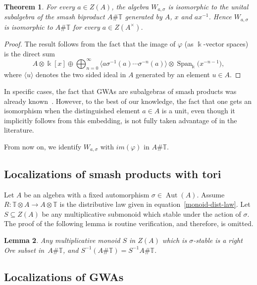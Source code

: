 \documentclass[pdftex]{sigma}
\newcommand{\B}[1]{\mathbb{#1}}
\numberwithin{equation}{section}
\newtheorem{Theorem}{Theorem}[section]
\newtheorem{Lemma}[Theorem]{Lemma}
\begin{document}
\begin{Theorem}\label{thm:UnitCase}
 For every $a\in Z(A)$, the algebra $W_{a,\sigma}$ is isomorphic to the unital subalgebra
 of the smash biproduct $A\# \B{T}$ generated by $A$, $x$ and $ax^{-1}$. Hence
 $W_{a,\sigma}$ is isomorphic to $A\# \B{T}$ for every $a\in Z(A^\times)$.
\end{Theorem}

\begin{proof}
 The result follows from the fact that the image of $\varphi$ (as $\Bbbk$-vector spaces)
 is the direct sum
 \[ A \otimes \Bbbk[x] \oplus \bigoplus_{n=0}^\infty \big\langle
 a\sigma^{-1}(a)\cdots\sigma^{-n}(a)\big\rangle\otimes \operatorname{Span}_{\Bbbk}\bigl(x^{-n-1}\bigr),
 \] where $\langle
 u\rangle$ denotes the two sided ideal in $A$ generated by an element $u\in A$.
\end{proof}

In specific cases, the fact that GWAs are subalgebras of smash products was already
known~\cite[Lemma~2.3]{Boddington:ResolutionOfTypeD}. However, to the best of our knowledge,
the fact that one gets an isomorphism when the distinguished element $a\in A$ is a unit,
even though it implicitly follows from this embedding, is not fully taken advantage of in
the literature.

From now on, we identify $W_{a,\sigma}$ with $im(\varphi)$ in $A\# \B{T}$.

\subsection{Localizations of smash products with tori}
\label{sect:localizationOfSmashProducts}

Let $A$ be an algebra with a fixed automorphism $\sigma\in \operatorname{Aut}(A)$. Assume
$R\colon \B{T}\otimes A\to A\otimes \B{T}$ is the distributive law given in
equation~\eqref{monoid-dist-law}. Let $S\subseteq Z(A)$ be any multiplicative submonoid
which stable under the action of $\sigma$. The proof of the following lemma is routine
verification, and therefore, is omitted.

\begin{Lemma}\label{lem:nc-localization}
 Any multiplicative monoid $S$ in $Z(A)$ which is $\sigma$-stable is a right Ore subset
 in~$A\# \B{T}$, and $S^{-1}(A\# \B{T}) = S^{-1}A\# \B{T}$.
\end{Lemma}

\subsection{Localizations of GWAs}
\end{document}
